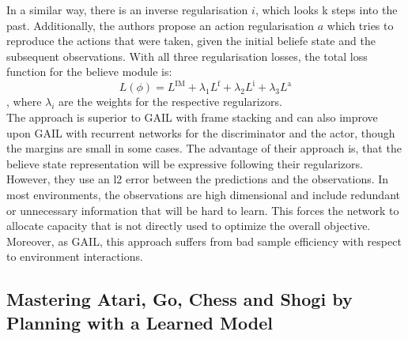 In a similar way, there is an inverse regularisation $i$, which looks k steps into the past. Additionally, the authors propose an action regularisation $a$ which tries to reproduce the actions that were 
taken, given the initial beliefe state and the subsequent observations. With all three regularisation losses, the total loss function for the believe module is:
\begin{equation}
    L(\phi) = L^\text{IM} + \lambda_1 L^\text{f} + \lambda_2 L^\text{i} + \lambda_3 L^\text{a}
\end{equation}
, where $\lambda_i$ are the weights for the respective regularizors. \\
The approach is superior to GAIL with frame stacking and can also improve upon GAIL with recurrent networks for the discriminator and the actor, though the margins are small in some cases. The advantage 
of their approach is, that the believe state representation will be expressive following their regularizors. However, they use an l2 error between the predictions and the observations. In most environments, 
the observations are high dimensional and include redundant or unnecessary information that will be hard to learn. This forces the network to allocate capacity that is not directly used to 
optimize the overall objective. Moreover, as GAIL, this approach suffers from bad sample efficiency with respect to environment interactions.

\subsection{Mastering Atari, Go, Chess and Shogi by Planning with a
Learned Model}

